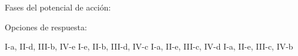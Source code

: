 \documentclass[12pt, letter]{exam}
\begin{document}
\begin{questions}
    Fases del potencial de acción:
    \renewcommand{\thepartno}{\alph{partno}}
    \begin{multicols}{2}
    \end{multicols}

    Opciones de respuesta:
    \begin{multicols}{2}
    \begin{tasks}
        \task I-a, II-d, III-b, IV-e
        \task I-e, II-b, III-d, IV-c
        \task I-a, II-e, III-c, IV-d
        \task I-a, II-e, III-c, IV-b
    \end{tasks}
    \end{multicols}

\end{questions}

\end{document}
